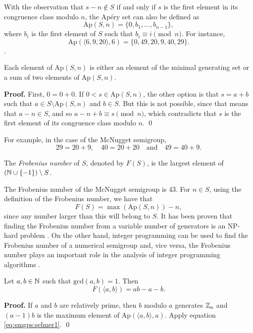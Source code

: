 With the observation that $s - n \notin S$ if and only if $s$ is the first element in its congruence class modulo $n$, the Apéry set can also be defined as  
\[\mathrm{Ap}(S, n) =  \{0, b_1, \ldots, b_{n - 1}\},\]
where $b_i$ is the first element of $S$ such that \(b_i \equiv i \pmod n\). 
For instance, \[\mathrm{Ap}(\langle 6, 9, 20 \rangle, 6) = \{0, 49, 20, 9, 40, 29\}.\]. 
\begin{proposition}
    Each element of $\mathrm{Ap}(S, n)$ is either an element of the minimal generating set or a sum of two elements of $\mathrm{Ap}(S, n)$. 
\end{proposition}
\textbf{Proof. } First, $0 = 0 + 0$. If $0 < s \in \mathrm{Ap}(S, n)$, the other option is that $s = a + b$ such that $a \in S\setminus\mathrm{Ap}(S, n)$ and $b \in S$. But this is not possible, since that means that $a - n \in S$, and so $a - n + b \equiv s \pmod{n}$, which contradicts that $s$ is the first element of its congruence class modulo $n$. \qed \par  
For example, in the case of the McNugget semigroup,
\[29 = 20 + 9, \quad 40 = 20 + 20 \quad \text{and} \quad 49 = 40 + 9.\]
\begin{definition}\label{def:smgps:frobeniusnum}
    The \textit{Frobenius number} of $S$, denoted by $F(S)$, is the largest element of $(\mathbb{N} \cup \{-1\}) \setminus S$.
\end{definition}

The Frobenius number of the McNugget semigroup is 43. For $n \in S$, using the definition of the Frobenius number, we have that
\begin{equation}\label{eq:smgps:selmer1}
    F(S) = \max (\mathrm{Ap}(S, n)) - n,
\end{equation}
since any number larger than this will belong to $S$. It has been proven that finding the Frobenius number from a variable number of generators is an NP-hard problem \cite{ramirez1996complexity}. On the other hand, integer programming can be used to find the Frobenius number of a numerical semigroup and, vice versa, the Frobenius number plays an important role in the analysis of integer programming algorithms \cite{aliev2011expected}.

\begin{theorem} Let $a, b \in \mathbb{N}$ such that $\mathrm{gcd}(a, b) = 1$. Then 
    \[F(\langle a, b \rangle) = ab - a - b.\] 
\end{theorem}
\textbf{Proof. } If $a$ and $b$ are relatively prime, then $b$ modulo $a$ generates $\mathbb{Z}_a$ and $(a - 1)b$ is the maximum element of $\mathrm{Ap}(\langle a, b\rangle, a)$. Apply equation \ref{eq:smgps:selmer1}. \qed


